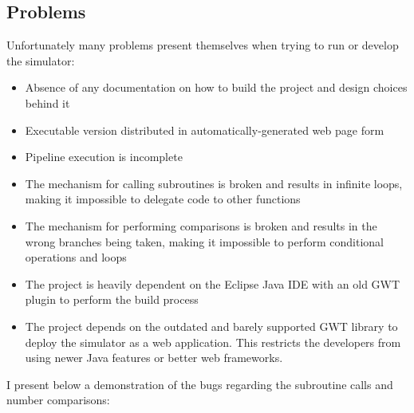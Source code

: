 \subsection*{Problems}

Unfortunately many problems present themselves when trying to run or develop the simulator:

\begin{itemize}[label=\textendash]
	\item Absence of any documentation on how to build the project and design choices behind it
	\item Executable version distributed in automatically-generated web page form
	\item Pipeline execution is incomplete
	\item The mechanism for calling subroutines is broken and results in infinite loops, making it impossible to delegate code to other functions
	\item The mechanism for performing comparisons is broken and results in the wrong branches being taken, making it impossible to perform conditional operations and loops
	\item The project is heavily dependent on the Eclipse Java IDE with an old GWT plugin to perform the build process
	\item The project depends on the outdated and barely supported GWT library to deploy the simulator as a web application. This restricts the developers from using newer Java features or better web frameworks.
\end{itemize}


I present below a demonstration of the bugs regarding the subroutine calls and number comparisons:

